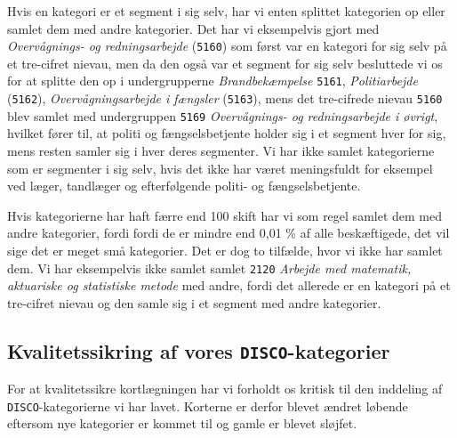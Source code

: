 Hvis en kategori er et segment i sig selv, har vi enten splittet kategorien op eller samlet dem med andre kategorier. Det har vi eksempelvis gjort med \emph{Overvågnings- og redningsarbejde} (\texttt{5160}) som først var en kategori for sig selv på et tre-cifret nievau, men da den også var et segment for sig selv besluttede vi os for at splitte den op i undergrupperne \emph{Brandbekæmpelse} \texttt{5161}, \emph{Politiarbejde} (\texttt{5162}), \emph{Overvågningsarbejde i fængsler} (\texttt{5163}), mens det tre-cifrede nievau \texttt{5160} blev samlet med undergruppen \texttt{5169} \emph{Overvågnings- og redningsarbejde i øvrigt}, hvilket fører til, at politi og fængselsbetjente holder sig i et segment hver for sig, mens resten samler sig i hver deres segmenter. Vi har ikke samlet kategorierne som er segmenter i sig selv, hvis det ikke har været meningsfuldt for eksempel ved læger, tandlæger og efterfølgende politi- og fængselsbetjente.

Hvis kategorierne har haft færre end 100 skift har vi som regel samlet dem med andre kategorier, fordi fordi de er mindre end 0,01 \% af alle beskæftigede, det vil sige det er meget små kategorier. Det er dog to tilfælde, hvor vi ikke har samlet dem. Vi har eksempelvis ikke samlet  samlet \texttt{2120} \emph{Arbejde med matematik, aktuariske og statistiske metode} med andre, fordi det allerede er en kategori på et tre-cifret nievau og den samle sig i et segment med andre kategorier.




\subsection{Kvalitetssikring af vores \texttt{DISCO}-kategorier \label{disco_kvalitet}}

For at kvalitetssikre kortlægningen har vi forholdt os kritisk til den inddeling af \texttt{DISCO}-kategorierne vi har lavet. Korterne er derfor blevet ændret løbende eftersom nye kategorier er kommet til og gamle er blevet sløjfet.

